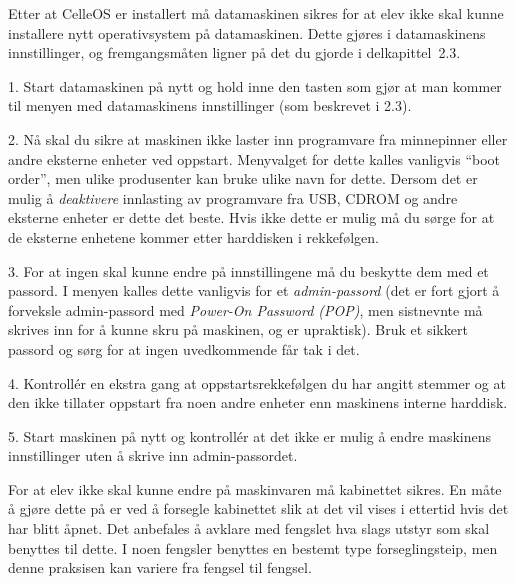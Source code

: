 
Etter at CelleOS er installert m\aa{} datamaskinen sikres for at elev ikke skal kunne installere nytt operativsystem p\aa{} datamaskinen. Dette gj\o res i datamaskinens innstillinger, og fremgangsm\aa ten ligner p\aa{} det du gjorde i delkapittel~2.3. 
\item{1.} Start datamaskinen p\aa{} nytt og hold inne den tasten som gj\o r at man kommer til menyen med datamaskinens innstillinger (som beskrevet i 2.3).
\item{2.} N\aa{} skal du sikre at maskinen ikke laster inn programvare fra minnepinner eller andre eksterne enheter ved oppstart. Menyvalget for dette kalles vanligvis ``boot order'', men ulike produsenter kan bruke ulike navn for dette. Dersom det er mulig \aa{} {\it deaktivere} innlasting av programvare fra USB, CDROM og andre eksterne enheter er dette det beste. Hvis ikke dette er mulig m\aa{} du s\o rge for at de eksterne enhetene kommer etter harddisken i rekkef\o lgen. 
\item{3.} For at ingen skal kunne endre p\aa{} innstillingene m\aa{} du beskytte dem med et passord. I menyen kalles dette vanligvis for et {\it admin-passord} (det er fort gjort \aa{} forveksle admin-passord med {\it Power-On Password (POP)}, men sistnevnte m\aa{} skrives inn for \aa{} kunne skru p\aa{} maskinen, og er upraktisk). Bruk et sikkert passord og s\o rg for at ingen uvedkommende f\aa r tak i det.
\item{4.} Kontroll\'er en ekstra gang at oppstartsrekkef\o lgen du har angitt stemmer og at den ikke tillater oppstart fra noen andre enheter enn maskinens interne harddisk.
\item{5.} Start maskinen p\aa{} nytt og kontroll\'er at det ikke er mulig \aa{} endre maskinens innstillinger uten \aa{} skrive inn admin-passordet.


For at elev ikke skal kunne endre p\aa{} maskinvaren m\aa{} kabinettet sikres. En m\aa te \aa{} gj\o re dette p\aa{} er ved \aa{} forsegle kabinettet slik at det vil vises i ettertid hvis det har blitt \aa pnet. Det anbefales \aa{} avklare med fengslet hva slags utstyr som skal benyttes til dette. I noen fengsler benyttes en bestemt type forseglingsteip, men denne praksisen kan variere fra fengsel til fengsel.


